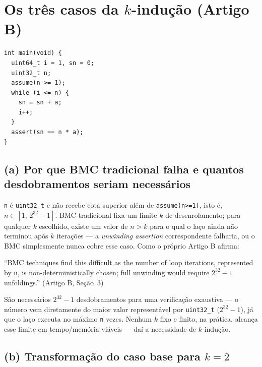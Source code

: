\documentclass[12pt,a4paper]{article}
\newcommand{\vv}[1]{\texttt{#1}}
\begin{document}
\section{Os três casos da $k$-indução (Artigo B)}

\begin{lstlisting}[style=cstyle,caption={Programa motivador, Artigo B (Fig.\ 2)}]
int main(void) {
  uint64_t i = 1, sn = 0;
  uint32_t n;
  assume(n >= 1);
  while (i <= n) {
    sn = sn + a;
    i++;
  }
  assert(sn == n * a);
}
\end{lstlisting}

\subsection{(a) Por que BMC tradicional falha e quantos desdobramentos seriam necessários}

\vv{n} \'e \vv{uint32\_t} e n\~ao recebe cota superior al\'em de \vv{assume(n>=1)}, isto \'e,
$n \in [1,\,2^{32}-1]$. BMC tradicional fixa um limite $k$ de desenrolamento; para qualquer $k$
escolhido, existe um valor de $n>k$ para o qual o la\c{c}o ainda n\~ao terminou ap\'os $k$
itera\c{c}\~oes --- a \emph{unwinding assertion} correspondente falharia, ou o BMC simplesmente
nunca cobre esse caso. Como o pr\'oprio Artigo B afirma:

\begin{tcolorbox}[quotebox]
``BMC techniques find this difficult as the number of loop iterations, represented by \texttt{n},
is non-deterministically chosen; full unwinding would require $2^{32}-1$ unfoldings.''
(Artigo B, Se\c{c}\~ao~3)
\end{tcolorbox}

\begin{tcolorbox}[resultbox]
S\~ao necess\'arios $2^{32}-1$ desdobramentos para uma verifica\c{c}\~ao exaustiva --- o
n\'umero vem diretamente do maior valor represent\'avel por \vv{uint32\_t} ($2^{32}-1$), j\'a
que o la\c{c}o executa no m\'aximo \vv{n} vezes. Nenhum $k$ fixo e finito, na pr\'atica,
alcan\c{c}a esse limite em tempo/mem\'oria vi\'aveis --- da\'i a necessidade de $k$-indu\c{c}\~ao.
\end{tcolorbox}

\subsection{(b) Transformação do caso base para $k=2$}
\end{document}

